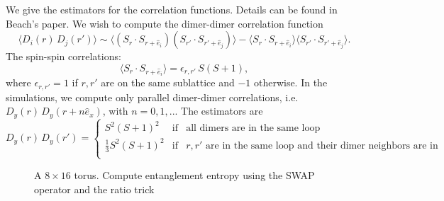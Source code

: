 \documentclass{article}
\begin{document}
We give the estimators for the correlation functions.
Details can be found in Beach's paper.
We wish to compute the dimer-dimer correlation function
%
\begin{equation}
	\langle D_i(r) \,D_j(r') \rangle \sim \langle (S_r \cdot S_{r+\hat{e}_i} ) (S_{r'} \cdot S_{r'+\hat{e}_j}) \rangle
			 - \langle S_r \cdot S_{r+\hat{e}_i} \rangle  \langle S_{r'} \cdot S_{r'+\hat{e}_j}\rangle.
\end{equation}
%
The spin-spin correlations:
%
\begin{equation}
	\langle S_r \cdot S_{r+\hat{e}_i} \rangle = \epsilon_{r,r'} \, S ( S+1),
\end{equation}
%
where $\epsilon_{r,r'} = 1$ if $r,r'$ are on the same sublattice and $-1$ otherwise.
%
In the simulations, we compute only parallel dimer-dimer correlations, i.e. $D_y(r) \, D_y(r+ n \hat{e}_x)$, with $n = 0, 1, ..$.
The estimators are
%
\begin{equation}
\displaystyle
D_y(r) \, D_y(r') = 
	\left\{ \begin{array}{rcl}
	S^2 ( S+1)^2 & \mbox{if} & \text{all dimers are in the same loop}\\
	 \frac{1}{3}S^2(S+1)^2 & \mbox{if} & r, r'\text{ are in the same loop and their dimer neighbors are in another loop}\\
	\end{array}\right.
\end{equation}

%
\begin{figure}[h]
	\begin{center}
	\end{center}
	\caption{A $8\times16$ torus. Compute entanglement entropy using the SWAP operator and the ratio trick}
	\label{fig:torus}
\end{figure}
%
\end{document}
